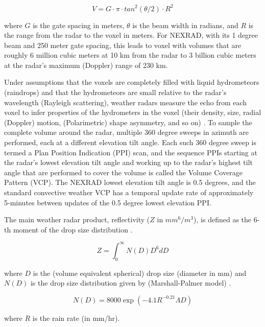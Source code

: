 \documentclass[proposal]{umassthesis}
\begin{document}
{\begin{equation}
V = G \cdot \pi \cdot tan^{2}(\theta/2) \cdot R^2
\end{equation}

 where $G$ is the gate spacing in meters, $\theta$ is the beam width in radians, and $R$ is the range from the radar to the voxel in meters. For NEXRAD, with its 1 degree beam and 250 meter gate spacing, this leads to voxel with volumes that are roughly 6 million cubic meters at 10 km from the radar to 3 billion cubic meters at the radar's maximum (Doppler) range of 230 km.

Under assumptions that the voxels are completely filled with liquid hydrometeors (raindrops) and that the hydrometeors are small relative to the radar's wavelength (Rayleigh scattering), weather radars measure the echo from each voxel to infer properties of the hydrometers in the voxel (their density, size, radial (Doppler) motion, (Polarimetric) shape asymmetry, and so on) \cite{bringi2001polarimetric} \cite{doviak1993doppler}. To sample the complete volume around the radar, multiple 360 degree sweeps in azimuth are performed, each at a different elevation tilt angle. Each such 360 degree sweep is termed a Plan Position Indication (PPI) scan, and the sequence PPIs starting at the radar's lowest elevation tilt angle and working up to the radar's highest tilt angle that are performed to cover the volume is called the Volume Coverage Pattern (VCP). The NEXRAD lowest elevation tilt angle is 0.5 degrees, and the standard convective weather VCP has a temporal update rate of approximately 5-minutes between updates of the 0.5 degree lowest elevation PPI.

The main weather radar product, reflectivity ($Z$ in $mm^6/m^3$), is defined as the 6-th moment of the drop size distribution \cite{doviak1993doppler}. 

\begin{equation}
Z = \int_{0}^{\infty} N(D) D^6 dD
\label{eqn:reflectivityDef}
\end{equation}

 where $D$ is the (volume equivalent spherical) drop size (diameter in mm) and $N(D)$ is the drop size distribution given by (Marshall-Palmer model) \cite{doviak1993doppler}. 

\begin{equation}
N(D) = 8000 \exp (-4.1 R^{-0.21} \Lambda D)
\label{eqn:MarshallPalmer}
\end{equation}

where $R$ is the rain rate (in mm/hr).

}
\end{document}
